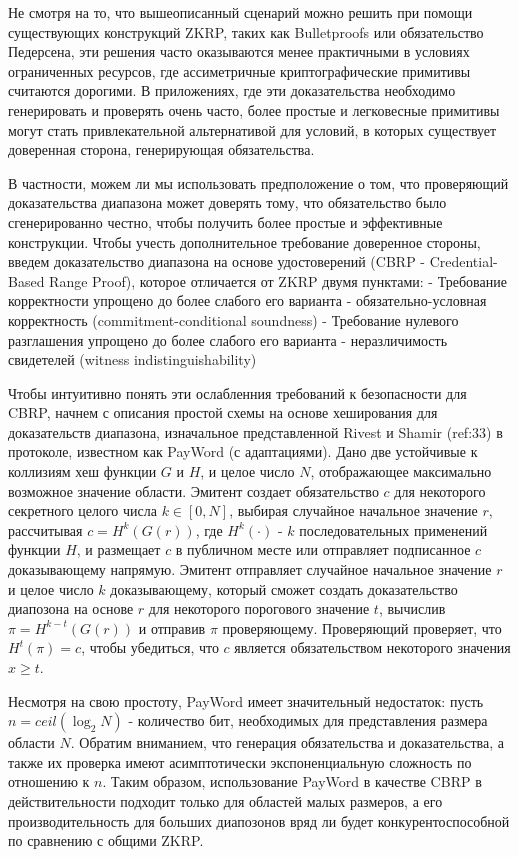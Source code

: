 \documentclass[a4paper]{article}
\begin{document}
	Не смотря на то, что вышеописанный сценарий можно решить при помощи существующих конструкций ZKRP, таких как Bulletproofs или обязательство Педерсена, эти решения часто оказываются менее практичными в условиях ограниченных ресурсов, где ассиметричные криптографические примитивы считаются дорогими.
	В приложениях, где эти доказательства необходимо генерировать и проверять очень часто, более простые и легковесные примитивы могут стать привлекательной альтернативой для условий, в которых существует доверенная сторона, генерирующая обязательства.

	В частности, можем ли мы использовать предположение о том, что проверяющий доказательства диапазона может доверять тому, что обязательство было сгенерированно честно, чтобы получить более простые и эффективные конструкции.
	Чтобы учесть дополнительное требование доверенное стороны, введем доказательство диапазона на основе удостоверений (CBRP - Credential-Based Range Proof), которое отличается от ZKRP двумя пунктами:
	- Требование корректности упрощено до более слабого его варианта - обязательно-условная корректность (commitment-conditional soundness)
	- Требование нулевого разглашения упрощено до более слабого его варианта - неразличимость свидетелей (witness indistinguishability)

	Чтобы интуитивно понять эти ослабленния требований к безопасности для CBRP, начнем с описания простой схемы на основе хеширования для доказательств диапазона, изначальное представленной Rivest и Shamir (ref:33) в протоколе, известном как PayWord (с адаптациями).
	Дано две устойчивые к коллизиям хеш функции $G$ и $H$, и целое число $N$, отображающее максимально возможное значение области.
	Эмитент создает обязательство $c$ для некоторого секретного целого числа $k \in [0, N]$, выбирая случайное начальное значение $r$, рассчитывая $c = H^k(G(r))$, где $H^k(\cdot)$ - $k$ последовательных применений функции $H$, и размещает $c$ в публичном месте или отправляет подписанное $c$ доказывающему напрямую.
	Эмитент отправляет случайное начальное значение $r$ и целое число $k$ доказывающему, который сможет создать доказательство диапозона на основе $r$ для некоторого порогового значение $t$, вычислив $\pi = H^{k - t}(G(r))$ и отправив $\pi$ проверяющему.
	Проверяющий проверяет, что $H^t(\pi) = c$, чтобы убедиться, что $c$ является обязательством некоторого значения $x \geq t$.

	Несмотря на свою простоту, PayWord имеет значительный недостаток: пусть $n = ceil(\log_2 N)$ - количество бит, необходимых для представления размера области $N$.
	Обратим вниманием, что генерация обязательства и доказательства, а также их проверка имеют асимптотически экспоненциальную сложность по отношению к $n$.
	Таким образом, использование PayWord в качестве CBRP в действительности подходит только для областей малых размеров, а его производительность для больших диапозонов вряд ли будет конкурентоспособной по сравнению с общими ZKRP.
\end{document}

